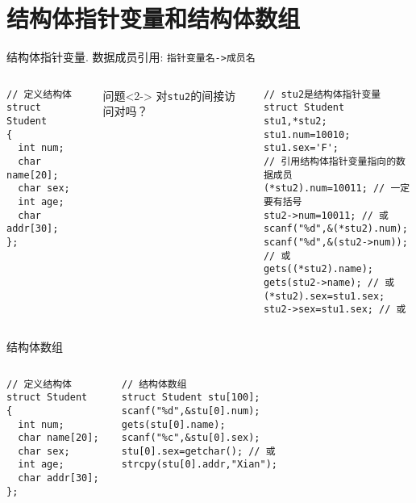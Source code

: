 \section{结构体指针变量和结构体数组}

\begin{frame}{结构体指针变量. 数据成员引用: \lstinline|指针变量名->成员名|}
\vspace{-0.5cm}
\begin{columns}[T]
\begin{lstlisting}
// 定义结构体
struct Student 
{ 
  int num;
  char name[20];
  char sex;
  int age;
  char addr[30]; 
};
\end{lstlisting}
\begin{block}{问题}<2->
	对\lstinline|stu2|的间接访问对吗？
\end{block}
\begin{lstlisting}[frame=leftline]
// stu2是结构体指针变量
struct Student stu1,*stu2;
stu1.num=10010;
stu1.sex='F';
// 引用结构体指针变量指向的数据成员
(*stu2).num=10011; // 一定要有括号
stu2->num=10011; // 或
scanf("%d",&(*stu2).num);
scanf("%d",&(stu2->num)); // 或
gets((*stu2).name); 
gets(stu2->name); // 或
(*stu2).sex=stu1.sex; 
stu2->sex=stu1.sex; // 或
\end{lstlisting}
\end{columns}
\medskip
\end{frame}


\begin{frame}{结构体数组}
\begin{columns}[T]
\begin{lstlisting}
// 定义结构体
struct Student 
{ 
  int num;
  char name[20];
  char sex;
  int age;
  char addr[30]; 
};
\end{lstlisting}
\begin{lstlisting}[frame=leftline]
// 结构体数组
struct Student stu[100];
scanf("%d",&stu[0].num);
gets(stu[0].name);
scanf("%c",&stu[0].sex);
stu[0].sex=getchar(); // 或
strcpy(stu[0].addr,"Xian");
\end{lstlisting}
\end{columns}
\medskip
\end{frame}


